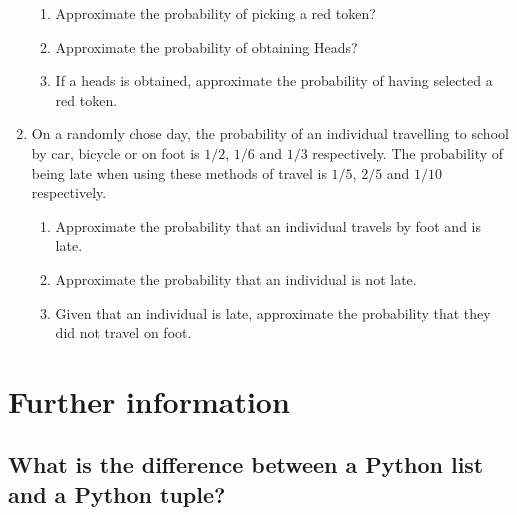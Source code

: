 \begin{enumerate}
\begin{enumerate}
\item 

Approximate the probability of picking a red token?

\item 

Approximate the probability of obtaining Heads?

\item 

If a heads is obtained, approximate the probability of having selected a red token.

\end{enumerate}

\item 

On a randomly chose day, the probability of an individual travelling to school by car, bicycle or on foot is \(1/2\), \(1/6\) and \(1/3\) respectively. The probability of being late when using these methods of travel is \(1/5\), \(2/5\) and \(1/10\) respectively.
\begin{enumerate}

\item 

Approximate the probability that an individual travels by foot and is late.

\item 

Approximate the probability that an individual is not late.

\item 

Given that an individual is late, approximate the probability that they did not travel on foot.

\end{enumerate}

\end{enumerate}


\section{Further information}
\label{\detokenize{tools-for-mathematics/06-probability/why/main:further-information}}\label{\detokenize{tools-for-mathematics/06-probability/why/main::doc}}

\subsection{What is the difference between a Python list and a Python tuple?}
\label{\detokenize{tools-for-mathematics/06-probability/why/main:what-is-the-difference-between-a-python-list-and-a-python-tuple}}\label{\detokenize{tools-for-mathematics/06-probability/why/main:difference-between-a-list-and-a-tuple}}

